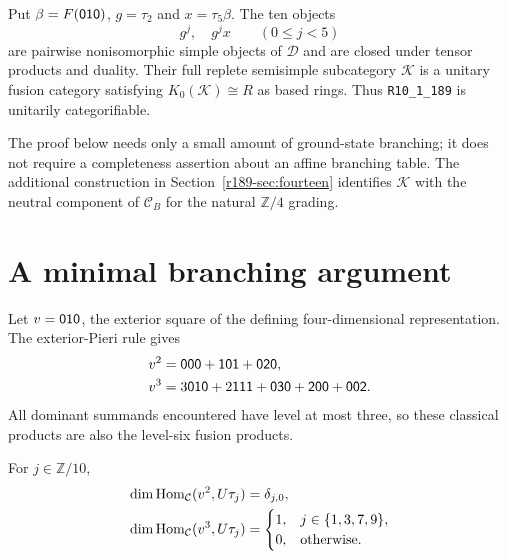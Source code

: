 \begin{theorem}\label{r189-thm:model}
Put $\beta=F(\mathsf{010})$, $g=\tau_2$ and $x=\tau_5\beta$. The ten objects
\[
  g^j,\quad g^jx\qquad (0\leq j<5)
\]
are pairwise nonisomorphic simple objects of $\mathcal{D}$ and are closed under
tensor products and duality. Their full replete semisimple subcategory
$\mathcal{K}$ is a unitary fusion category satisfying $K_0(\mathcal{K})\cong R$ as based
rings. Thus \texttt{R10\_1\_189} is unitarily categorifiable.
\end{theorem}

The proof below needs only a small amount of ground-state branching; it
does not require a completeness assertion about an affine branching
table. The additional construction in Section~\ref{r189-sec:fourteen}
identifies $\mathcal{K}$ with the neutral component of $\mathcal{C}_B$ for the natural
$\mathbb Z/4$ grading.

\section{A minimal branching argument}

Let $v=\mathsf{010}$, the exterior square of the defining four-dimensional
representation. The exterior-Pieri rule gives
\begin{align}
 v^2&=\mathsf{000}+\mathsf{101}+\mathsf{020},\label{r189-eq:v2}\\
 v^3&=3\mathsf{010}+2\mathsf{111}+\mathsf{030}+\mathsf{200}+\mathsf{002}.
 \label{r189-eq:v3}
\end{align}
All dominant summands encountered have level at most three, so these
classical products are also the level-six fusion products.

\begin{lemma}\label{r189-lem:branch}
For $j\in\mathbb Z/10$,
\begin{align}
 \dim\operatorname{Hom}_{\mathcal{C}}(v^2,U\tau_j)&=\delta_{j,0},\label{r189-eq:hom2}\\
 \dim\operatorname{Hom}_{\mathcal{C}}(v^3,U\tau_j)&=
 \begin{cases}1,&j\in\{1,3,7,9\},\\0,&\text{otherwise.}\end{cases}
 \label{r189-eq:hom3}
\end{align}
\end{lemma}

